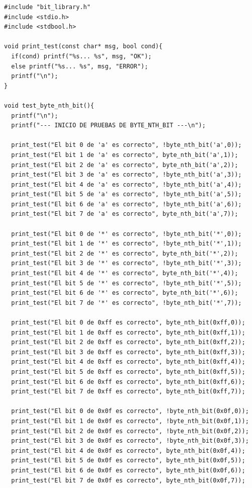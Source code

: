 \documentclass[11pt]{article}
\begin{document}
    \newpage
    \begin{lstlisting}[style=Cstyle]
#include "bit_library.h"
#include <stdio.h>
#include <stdbool.h>

void print_test(const char* msg, bool cond){
  if(cond) printf("%s... %s", msg, "OK");
  else printf("%s... %s", msg, "ERROR");
  printf("\n");
}

void test_byte_nth_bit(){
  printf("\n");
  printf("--- INICIO DE PRUEBAS DE BYTE_NTH_BIT ---\n");

  print_test("El bit 0 de 'a' es correcto", !byte_nth_bit('a',0));
  print_test("El bit 1 de 'a' es correcto", byte_nth_bit('a',1));
  print_test("El bit 2 de 'a' es correcto", byte_nth_bit('a',2));
  print_test("El bit 3 de 'a' es correcto", !byte_nth_bit('a',3));
  print_test("El bit 4 de 'a' es correcto", !byte_nth_bit('a',4));
  print_test("El bit 5 de 'a' es correcto", !byte_nth_bit('a',5));
  print_test("El bit 6 de 'a' es correcto", !byte_nth_bit('a',6));
  print_test("El bit 7 de 'a' es correcto", byte_nth_bit('a',7));

  print_test("El bit 0 de '*' es correcto", !byte_nth_bit('*',0));
  print_test("El bit 1 de '*' es correcto", !byte_nth_bit('*',1));
  print_test("El bit 2 de '*' es correcto", byte_nth_bit('*',2));
  print_test("El bit 3 de '*' es correcto", !byte_nth_bit('*',3));
  print_test("El bit 4 de '*' es correcto", byte_nth_bit('*',4));
  print_test("El bit 5 de '*' es correcto", !byte_nth_bit('*',5));
  print_test("El bit 6 de '*' es correcto", byte_nth_bit('*',6));
  print_test("El bit 7 de '*' es correcto", !byte_nth_bit('*',7));

  print_test("El bit 0 de 0xff es correcto", byte_nth_bit(0xff,0));
  print_test("El bit 1 de 0xff es correcto", byte_nth_bit(0xff,1));
  print_test("El bit 2 de 0xff es correcto", byte_nth_bit(0xff,2));
  print_test("El bit 3 de 0xff es correcto", byte_nth_bit(0xff,3));
  print_test("El bit 4 de 0xff es correcto", byte_nth_bit(0xff,4));
  print_test("El bit 5 de 0xff es correcto", byte_nth_bit(0xff,5));
  print_test("El bit 6 de 0xff es correcto", byte_nth_bit(0xff,6));
  print_test("El bit 7 de 0xff es correcto", byte_nth_bit(0xff,7));

  print_test("El bit 0 de 0x0f es correcto", !byte_nth_bit(0x0f,0));
  print_test("El bit 1 de 0x0f es correcto", !byte_nth_bit(0x0f,1));
  print_test("El bit 2 de 0x0f es correcto", !byte_nth_bit(0x0f,2));
  print_test("El bit 3 de 0x0f es correcto", !byte_nth_bit(0x0f,3));
  print_test("El bit 4 de 0x0f es correcto", byte_nth_bit(0x0f,4));
  print_test("El bit 5 de 0x0f es correcto", byte_nth_bit(0x0f,5));
  print_test("El bit 6 de 0x0f es correcto", byte_nth_bit(0x0f,6));
  print_test("El bit 7 de 0x0f es correcto", byte_nth_bit(0x0f,7));


\end{lstlisting}
\end{document}
